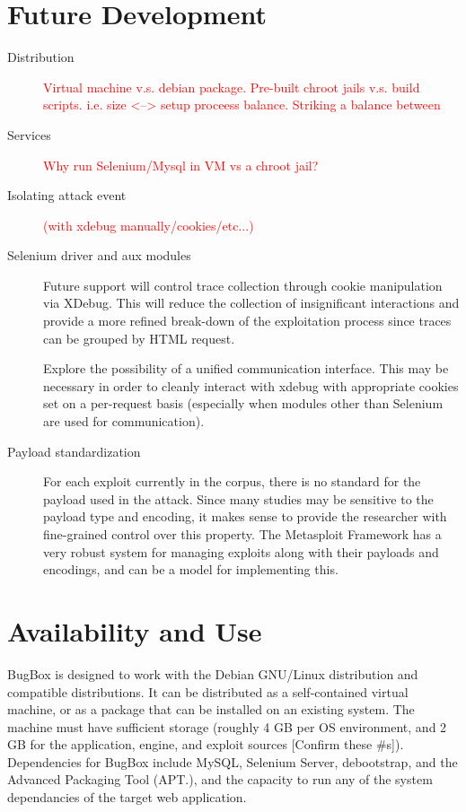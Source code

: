 \documentclass[letterpaper,twocolumn,10pt]{article}
\begin{document}
\section{Future Development}
 \begin{description}
   \item[Distribution]
     \textcolor{red}{Virtual machine v.s. debian package. Pre-built chroot jails v.s. build scripts.
     i.e. size <--> setup proceess balance. Striking a balance between}
   \item[Services]
     \textcolor{red}{Why run Selenium/Mysql in VM vs a chroot jail?}
   \item[Isolating attack event]
     \textcolor{red}{(with xdebug manually/cookies/etc...)}   
   \item[Selenium driver and aux modules]
  Future support will control trace collection through cookie manipulation via XDebug. This will reduce the collection of insignificant interactions and provide a more refined break-down of the exploitation process since traces can be grouped by HTML request.  \par
   Explore the possibility of a unified communication interface. This may be necessary in order to cleanly interact with xdebug with appropriate cookies set on a per-request basis (especially when modules other than Selenium are used for communication).
   \item[Payload standardization]
For each exploit currently in the corpus, there is no standard for the payload used in the attack. Since many studies may be sensitive to the payload type and encoding, it makes sense to provide the researcher with fine-grained control over this property. The Metasploit Framework has a very robust system for managing exploits along with their payloads and encodings, and can be a model for implementing this.
 \end{description}


\section{Availability and Use}

BugBox is designed to work with the Debian GNU/Linux distribution and compatible distributions.  It can be distributed as a self-contained virtual machine, or as a package that can be installed on an existing system. The machine must have sufficient storage (roughly 4 GB per OS environment, and 2 GB for the application, engine, and exploit sources [Confirm these \#s]).  Dependencies for BugBox include MySQL,  Selenium Server, debootstrap, and the Advanced Packaging Tool (APT.), and the capacity to run any of the system dependancies of the target web application.
\end{document}

